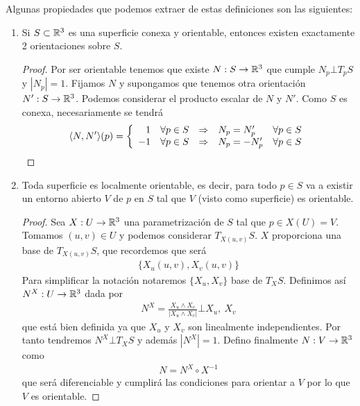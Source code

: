 \begin{propiedades}
    Algunas propiedades que podemos extraer de estas definiciones son las siguientes:
    \begin{enumerate}
        \item Si $S\subset \mathbb{R}^3$ es una superficie conexa y orientable, entonces existen exactamente 2 orientaciones sobre $S$.
        \begin{proof}
            Por ser orientable tenemos que existe $N:S\to \mathbb{R}^3$ que cumple $N_p\bot T_pS$ y $|N_p|=1$. Fijamos $N$ y supongamos que tenemos otra orientación $N':S\to \mathbb{R}^3$. Podemos considerar el producto escalar de $N$ y $N'$.
            Como $S$ es conexa, necesariamente se tendrá
            \begin{gather*}
                \langle N, N' \rangle (p) = \left\{
                \begin{array}{r c c l l}
                    1 & \forall p \in S & \Rightarrow & N_p=N'_p & \forall p \in S\\
                    -1 & \forall p \in S & \Rightarrow & N_p=-N'_p & \forall p \in S
                \end{array}
                \right.
            \end{gather*}
        \end{proof}
        \item Toda superficie es localmente orientable, es decir, para todo $p\in S$ va a existir un entorno abierto $V$ de $p$ en $S$ tal que $V$ (visto como superficie) es orientable.
        \begin{proof}
            Sea $X:U\to \mathbb{R}^3$ una parametrización de $S$ tal que $p\in X(U)=V$. Tomamos $(u,v)\in U$ y podemos considerar $T_{X(u,v)}S$. $X$ proporciona una base de $T_{X(u,v)}S$, que recordemos que será 
            \begin{gather*}
                \{X_u(u,v), X_v(u,v)\}
            \end{gather*}
            Para simplificar la notación notaremos $\{X_u,X_v\}$ base de $T_XS$. Definimos así $N^X:U \to \mathbb{R}^3$ dada por 
            \begin{gather*}
                N^X = \frac{X_u \wedge X_v}{|X_u \wedge X_v|}\bot X_u,\ X_v
            \end{gather*}
            que está bien definida ya que $X_u$ y $X_v$ son linealmente independientes. Por tanto tendremos $N^X \bot T_XS$ y además $|N^X| = 1$. Defino finalmente $N:V \to \mathbb{R}^3$ como 
            \begin{gather*}
                N = N^X \circ X^{-1}
            \end{gather*}
            que será diferenciable y cumplirá las condiciones para orientar a $V$ por lo que $V$ es orientable.
        \end{proof}
    \end{enumerate}
\end{propiedades}

